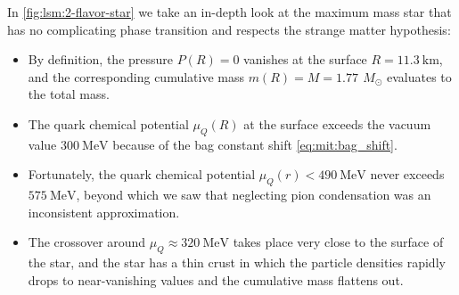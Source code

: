 In \cref{fig:lsm:2-flavor-star} we take an in-depth look at the maximum mass star that has no complicating phase transition and respects the strange matter hypothesis:
\begin{itemize}
\label{list:lsm:2-flavor-star-discussion}
\item By definition, the pressure $P(R)=0$ vanishes at the surface $R=\SI{11.3}{\kilo\meter}$,
      and the corresponding cumulative mass $m(R)=M=\SI{1.77}{}\,M_\odot$ evaluates to the total mass.
\item The quark chemical potential $\mu_Q(R)$ at the surface exceeds the vacuum value $\SI{300}{\mega\electronvolt}$ because of the bag constant shift \eqref{eq:mit:bag_shift}.
\item Fortunately, the quark chemical potential $\mu_Q(r) < \SI{490}{\mega\electronvolt}$ never exceeds $\SI{575}{\mega\electronvolt}$, beyond which we saw that neglecting pion condensation was an inconsistent approximation. %
\item The crossover around $\mu_Q \approx \SI{320}{\mega\electronvolt}$ takes place very close to the surface of the star,
      and the star has a thin crust in which the particle densities rapidly drops to near-vanishing values and the cumulative mass flattens out.
\end{itemize}

